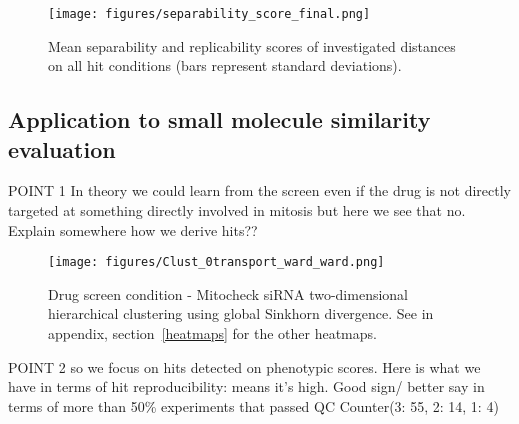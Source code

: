 \begin{figure*}[ht!]
\centerline{\texttt{[image: figures/separability\_score\_final.png]}
}
\caption{Mean separability and replicability scores of investigated distances on all hit conditions (bars represent standard deviations).}
\label{separability}
\end{figure*}

\subsection{Application to small molecule similarity evaluation}
POINT 1 In theory we could learn from the screen even if the drug is not directly targeted at something directly involved in mitosis but here we see that no. Explain somewhere how we derive hits??

\begin{figure*}[ht!]
\centerline{\texttt{[image: figures/Clust\_0transport\_ward\_ward.png]}}

\caption{Drug screen condition - Mitocheck siRNA two-dimensional hierarchical clustering using global Sinkhorn divergence. See in appendix, section~\ref{heatmaps} for the other heatmaps.}
\label{cond_clust_transport}
\end{figure*}

POINT 2 so we focus on hits detected on phenotypic scores. Here is what we have in terms of hit reproducibility: means it's high. Good sign/ better say in terms of more than 50\% experiments that passed QC
Counter({3: 55, 2: 14, 1: 4})

